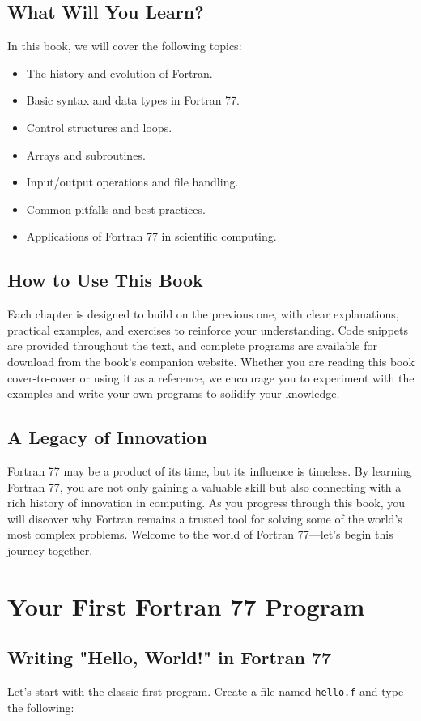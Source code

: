 \documentclass{book}
\begin{document}
\section*{What Will You Learn?}
In this book, we will cover the following topics:
\begin{itemize}
    \item The history and evolution of Fortran.
    \item Basic syntax and data types in Fortran 77.
    \item Control structures and loops.
    \item Arrays and subroutines.
    \item Input/output operations and file handling.
    \item Common pitfalls and best practices.
    \item Applications of Fortran 77 in scientific computing.
\end{itemize}

\section*{How to Use This Book}
Each chapter is designed to build on the previous one, with clear explanations, practical examples, and exercises to reinforce your understanding. Code snippets are provided throughout the text, and complete programs are available for download from the book's companion website. Whether you are reading this book cover-to-cover or using it as a reference, we encourage you to experiment with the examples and write your own programs to solidify your knowledge.

\section*{A Legacy of Innovation}
Fortran 77 may be a product of its time, but its influence is timeless. By learning Fortran 77, you are not only gaining a valuable skill but also connecting with a rich history of innovation in computing. As you progress through this book, you will discover why Fortran remains a trusted tool for solving some of the world's most complex problems. Welcome to the world of Fortran 77—let's begin this journey together.

\chapter{Your First Fortran 77 Program}

\section*{Writing "Hello, World!" in Fortran 77}
Let's start with the classic first program. Create a file named \texttt{hello.f} and type the following:
\end{document}
